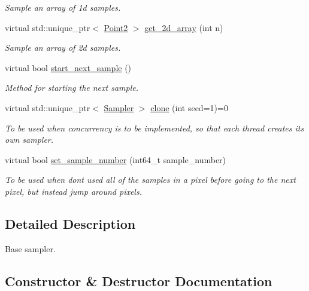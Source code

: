 \begin{DoxyCompactItemize}
\begin{DoxyCompactList}\small\item\em Sample an array of 1d samples. \end{DoxyCompactList}\item 
virtual std\+::unique\+\_\+ptr$<$ \mbox{\hyperlink{namespaceomg_a18e42fb7bbc4159e9137145b866ec578}{Point2}} $>$ \mbox{\hyperlink{classomg_1_1_sampler_a3f727fa083652776d02cfe43cf8f24db}{get\+\_\+2d\+\_\+array}} (int n)
\begin{DoxyCompactList}\small\item\em Sample an array of 2d samples. \end{DoxyCompactList}\item 
virtual bool \mbox{\hyperlink{classomg_1_1_sampler_ae2b33610cc24dced31dd8d15b4778cba}{start\+\_\+next\+\_\+sample}} ()
\begin{DoxyCompactList}\small\item\em Method for starting the next sample. \end{DoxyCompactList}\item 
virtual std\+::unique\+\_\+ptr$<$ \mbox{\hyperlink{classomg_1_1_sampler}{Sampler}} $>$ \mbox{\hyperlink{classomg_1_1_sampler_ae546e8114ce2d6fc1b760c10a73f6d71}{clone}} (int seed=1)=0
\begin{DoxyCompactList}\small\item\em To be used when concurrency is to be implemented, so that each thread creates its own sampler. \end{DoxyCompactList}\item 
virtual bool \mbox{\hyperlink{classomg_1_1_sampler_aceffa7bf3f74a77dafb12192b0aaf232}{set\+\_\+sample\+\_\+number}} (int64\+\_\+t sample\+\_\+number)
\begin{DoxyCompactList}\small\item\em To be used when don\textquotesingle{}t used all of the samples in a pixel before going to the next pixel, but instead jump around pixels. \end{DoxyCompactList}\end{DoxyCompactItemize}


\subsection{Detailed Description}
Base sampler. 



\subsection{Constructor \& Destructor Documentation}
\mbox{\label{classomg_1_1_sampler_a6cf599ab70a735b2a352b20f35a0e2eb}} 
